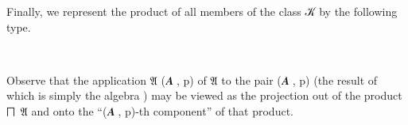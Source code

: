 \ccpad
Finally, we represent the product of all members of the class \ab 𝒦 by the following type.
\ccpad
\begin{code}%
\>[0][@{}l@{\AgdaIndent{0}}]%
\>[1]\AgdaSpace{}%
\AgdaSymbol{:}\AgdaSpace{}%
\AgdaSpace{}%
\AgdaSymbol{(}\AgdaSpace{}%
\AgdaSymbol{)}\AgdaSpace{}%
\<%
\\
%
\>[1]\AgdaSpace{}%
\AgdaSymbol{=}\AgdaSpace{}%
\AgdaSpace{}%
\<%
\end{code}
\ccpad
Observe that the application \af 𝔄 (\ab 𝑨 , \ab p) of \af 𝔄 to the pair (\ab 𝑨 , \ab p) (the result of which is simply the algebra ) may be viewed as the projection out of the product \af ⨅~\af 𝔄 and onto the ``(\ab 𝑨 , \ab p)-th component'' of that product.

